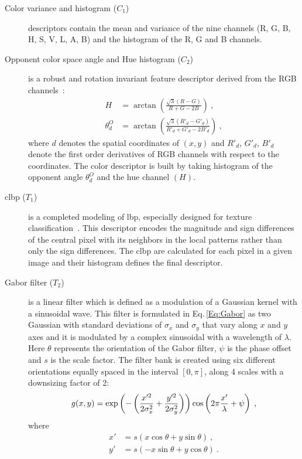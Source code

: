 \begin{description}
\item[Color variance and histogram ($C_{1}$)] descriptors contain the mean and variance of the nine channels (R, G, B, H, S, V, L, A, B) and the histogram of the R, G and B channels.
\item[Opponent color space angle and Hue histogram ($C_{2}$)] is a robust and rotation invariant feature descriptor derived from the RGB channels~\cite{van2006coloring}:
  \begin{align}\label{Eq:AngO}
    H &= \arctan\left(\frac{\sqrt{3}\left(R-G\right)}{R+G-2B}\right) \ , \nonumber \\
    \theta^{O}_{d} &= \arctan \left( \frac{\sqrt{3}\left(R'_{d}-G'_{d}\right)}{R'_{d}+G'_{d}-2B'_{d}}\right) \ ,
  \end{align}
\noindent where $d$ denotes the spatial coordinates of $(x,y)$ and $R'_{d}$, $G'_{d}$, $B'_{d}$ denote the first order derivatives of RGB channels with respect to the coordinates. 
The color descriptor is built by taking histogram of the opponent angle $\theta^{O}_{d}$ and the hue channel $(H)$.
\item[\ac{clbp} ($T_{1}$)] is a completed modeling of \Ac{lbp}, especially designed for texture classification~\cite{guo2010completed}. 
This descriptor encodes the magnitude and sign differences of the central pixel with its neighbors in the local patterns rather than only the sign differences. 
The \ac{clbp} are calculated for each pixel in a given image and their histogram defines the final descriptor.
\item[Gabor filter ($T_{2}$)] is a linear filter which is defined as a modulation of a Gaussian kernel with a sinusoidal wave. 
This filter is formulated in Eq.\,\eqref{Eq:Gabor} as two Gaussian with standard deviations of $\sigma_{x}$ and $\sigma_{y}$ that vary along $x$ and $y$ axes and it is modulated by a complex sinusoidal with a wavelength of $\lambda$. 
Here $\theta$ represents the orientation of the Gabor filter, $\psi$ is the phase offset and $s$ is the scale factor. 
The filter bank is created using six different orientations equally spaced in the interval $[0, \pi]$, along 4 scales with a downsizing factor of 2:
\begin{equation}\scriptsize
  \label{Eq:Gabor}
  g(x,y) = \exp{ \left(-\left( \frac{x'^{2}}{2\sigma_{x}^{2}}+\frac{y'^{2}}{2\sigma_{y}^{2}} \right) \right)} \cos\left( 2\pi\frac{x'}{\lambda}+\psi \right) \ , 
\end{equation}
\noindent where
\begin{align*}
  x' &= s\left( x\cos\theta+y\sin\theta\right) \ ,  \\
  y' &= s\left( -x\sin\theta +y\cos\theta\right) \ .
\end{align*}

\end{description}



